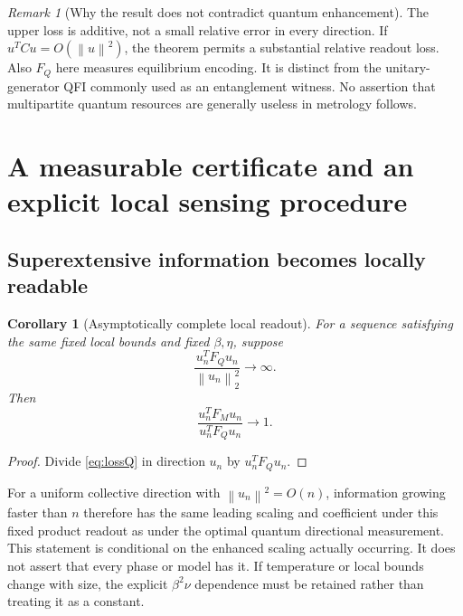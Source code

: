 \documentclass[11pt,a4paper]{article}
\newtheorem{corollary}[theorem]{Corollary}
\theoremstyle{remark}
\newtheorem{remark}[theorem]{Remark}
\newcommand{\norm}[1]{\left\lVert #1\right\rVert}
\begin{document}
\begin{remark}[Why the result does not contradict quantum enhancement]
The upper loss is additive, not a small relative error in every direction. If $u^TCu=O(\norm{u}^2)$, the theorem permits a substantial relative readout loss. Also $F_Q$ here measures equilibrium encoding. It is distinct from the unitary-generator QFI commonly used as an entanglement witness. No assertion that multipartite quantum resources are generally useless in metrology follows.
\end{remark}

\section{A measurable certificate and an explicit local sensing procedure}

\subsection{Superextensive information becomes locally readable}

\begin{corollary}[Asymptotically complete local readout]\label{cor:super}
For a sequence satisfying the same fixed local bounds and fixed $\beta,\eta$, suppose
\[
 \frac{u_n^TF_Qu_n}{\norm{u_n}_2^2}\longrightarrow\infty.
\]
Then
\begin{equation}
 \frac{u_n^TF_Mu_n}{u_n^TF_Qu_n}\longrightarrow1.
 \label{eq:super}
\end{equation}
\end{corollary}
\begin{proof}
Divide \eqref{eq:lossQ} in direction $u_n$ by $u_n^TF_Qu_n$.
\end{proof}

For a uniform collective direction with $\norm{u_n}^2=O(n)$, information growing faster than $n$ therefore has the same leading scaling and coefficient under this fixed product readout as under the optimal quantum directional measurement. This statement is conditional on the enhanced scaling actually occurring. It does not assert that every phase or model has it. If temperature or local bounds change with size, the explicit $\beta^2\nu$ dependence must be retained rather than treating it as a constant.
\end{document}
